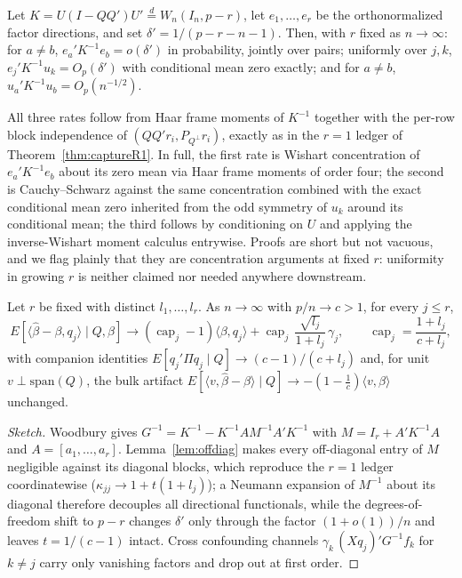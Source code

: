 \begin{lemma}\label{lem:offdiag}
Let $K=U(I-QQ')U'\stackrel{d}{=}W_n(I_n,p-r)$, let $e_1,\dots,e_r$ be the orthonormalized factor directions, and set $\delta'=1/(p-r-n-1)$. Then, with $r$ fixed as $n\to\infty$: for $a\ne b$, $e_a'K^{-1}e_b=o(\delta')$ in probability, jointly over pairs; uniformly over $j,k$, $e_j'K^{-1}u_k=O_p(\delta')$ with conditional mean zero exactly; and for $a\ne b$, $u_a'K^{-1}u_b=O_p(n^{-1/2})$.
\end{lemma}

All three rates follow from Haar frame moments of $K^{-1}$ together with the per-row block independence of $(QQ'r_i, P_{Q^\perp}r_i)$, exactly as in the $r=1$ ledger of Theorem~\ref{thm:captureR1}. In full, the first rate is Wishart concentration of $e_a'K^{-1}e_b$ about its zero mean via Haar frame moments of order four; the second is Cauchy--Schwarz against the same concentration combined with the exact conditional mean zero inherited from the odd symmetry of $u_k$ around its conditional mean; the third follows by conditioning on $U$ and applying the inverse-Wishart moment calculus entrywise. Proofs are short but not vacuous, and we flag plainly that they are concentration arguments at fixed $r$: uniformity in growing $r$ is neither claimed nor needed anywhere downstream.

\begin{theorem}\label{thm:captureFixedR}
Let $r$ be fixed with distinct $l_1,\dots,l_r$. As $n\to\infty$ with $p/n\to c>1$, for every $j\le r$,
\[
E[\langle\hat\beta-\beta,q_j\rangle\mid Q,\beta]
\to(\operatorname{cap}_j-1)\langle\beta,q_j\rangle
+\operatorname{cap}_j\,\frac{\sqrt{l_j}}{1+l_j}\,\gamma_j,
\qquad \operatorname{cap}_j=\frac{1+l_j}{c+l_j},
\]
with companion identities $E[q_j'\Pi q_j\mid Q]\to(c-1)/(c+l_j)$ and, for unit $v\perp\mathrm{span}(Q)$, the bulk artifact $E[\langle v,\hat\beta-\beta\rangle\mid Q]\to-(1-\tfrac1c)\langle v,\beta\rangle$ unchanged.
\end{theorem}

\begin{proof}[Sketch]
Woodbury gives $G^{-1}=K^{-1}-K^{-1}AM^{-1}A'K^{-1}$ with $M=I_r+A'K^{-1}A$ and $A=[a_1,\dots,a_r]$. Lemma~\ref{lem:offdiag} makes every off-diagonal entry of $M$ negligible against its diagonal blocks, which reproduce the $r=1$ ledger coordinatewise ($\kappa_{jj}\to 1+t(1+l_j)$); a Neumann expansion of $M^{-1}$ about its diagonal therefore decouples all directional functionals, while the degrees-of-freedom shift to $p-r$ changes $\delta'$ only through the factor $(1+o(1))/n$ and leaves $t=1/(c-1)$ intact. Cross confounding channels $\gamma_k\,(Xq_j)'G^{-1}f_k$ for $k\ne j$ carry only vanishing factors and drop out at first order.
\end{proof}

